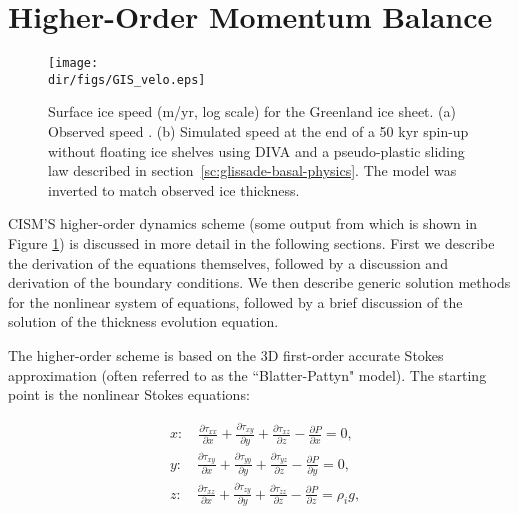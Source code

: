 
\section{Higher-Order Momentum Balance}
\label{sc:higher-order-mom}

\begin{figure}
  \begin{center}
    \texttt{[image: \\dir/figs/GIS\_velo.eps]}
   \end{center}
  \caption{Surface ice speed (m/yr, log scale) for the Greenland ice sheet. (a) Observed speed \citep{joughin2010measures}. (b) Simulated speed at the end of a 50 kyr spin-up without floating ice shelves using DIVA and a pseudo-plastic sliding law described in section~\ref{sc:glissade-basal-physics}. The model was inverted to match observed ice thickness.}
  \label{fig:GIS_PNAS}
\end{figure} 

CISM'S higher-order dynamics scheme (some output from which is shown in Figure \ref{fig:GIS_PNAS}) is discussed in more detail in the following sections. 
First we describe the derivation of the equations themselves, followed by a discussion and derivation of the boundary conditions.
We then describe generic solution methods for the nonlinear system of equations, followed by a
brief discussion of the solution of the thickness evolution equation.


The higher-order scheme is based on the 3D first-order accurate Stokes approximation (often referred to as the ``Blatter-Pattyn" model). The starting point is the nonlinear Stokes equations:

\begin{equation}
  \begin{split}
    & x:\quad \frac{\partial \tau _{xx}}{\partial x} + \frac{\partial \tau _{xy}}{\partial y} + \frac{\partial \tau _{xz}}{\partial z} - \frac{\partial P}{\partial x} = 0, \\ 
    & y:\quad \frac{\partial \tau _{xy}}{\partial x} + \frac{\partial \tau _{yy}}{\partial y} + \frac{\partial \tau _{yz}}{\partial z} - \frac{\partial P}{\partial y} = 0, \\ 
    & z:\quad \frac{\partial \tau _{xz}}{\partial x} + \frac{\partial \tau _{zy}}{\partial y} + \frac{\partial \tau _{zz}}{\partial z} - \frac{\partial P}{\partial z} = \rho_i g,
  \end{split}
\end{equation}

